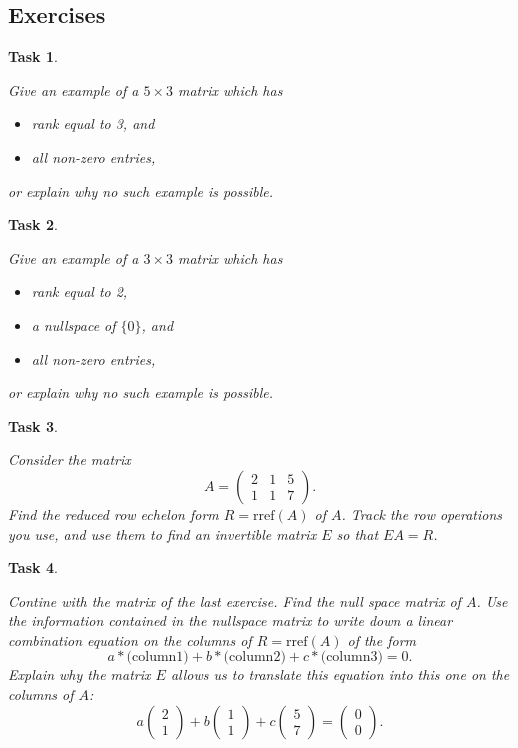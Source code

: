 \documentclass[10pt,]{book}
\theoremstyle{plain}
\numberwithin{equation}{section}
\newtheorem{task}{Task}[chapter]
\begin{document}
\subsection[Exercises]{Exercises}\label{subsection-72}
\begin{task}
\label{task-94}

        Give an example of a \(5 \times 3\) matrix which has
        \begin{itemize}
\item{}rank equal to 3, and\item{}all non-zero entries,\end{itemize}

        or explain why no such example is possible.
      \end{task}
\begin{task}
\label{task-95}

        Give an example of a \(3 \times 3\) matrix which has
        \begin{itemize}
\item{}rank equal to 2,\item{}a nullspace of \(\{0\}\), and\item{}all non-zero entries,\end{itemize}

        or explain why no such example is possible.
      \end{task}
\begin{task}
\label{task-96}

        Consider the matrix \[
        A = \left( \begin{smallmatrix} 2 & 1 & 5 \\ 1 & 1
        & 7 \end{smallmatrix}\right).\]
        Find the reduced row echelon form \(R = \mathrm{rref}(A)\)
        of \(A\). Track the row operations you use, and use them to
        find an invertible matrix \(E\) so that \(EA = R\).
      \end{task}
\begin{task}
\label{task-97}

        Contine with the matrix of the last exercise. Find the null space matrix of
        \(A\). Use the information contained in the nullspace matrix to
        write down a linear combination equation on the columns of
        \(R = \mathrm{rref}(A)\) of the form
        \[
          a * \text{(column1)} + b * \text{(column2)} + c * \text{(column3)} = 0.
        \]
        Explain why the matrix \(E\) allows us to translate this equation
        into this one on the columns of \(A\):
        \[
          a\begin{pmatrix} 2 \\ 1 \end{pmatrix} +
          b \begin{pmatrix} 1 \\ 1 \end{pmatrix} +
          c \begin{pmatrix} 5 \\ 7 \end{pmatrix} =
          \begin{pmatrix}0\\ 0 \end{pmatrix}.
        \]\end{task}
\end{document}
